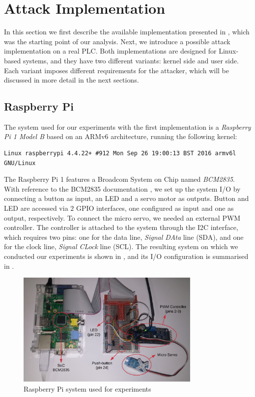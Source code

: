 \section{Attack Implementation}
\label{sec:attack-impl}

In this section we first describe the available implementation presented in \cite{ghostplc}, which was the starting point of our analysis.
Next, we introduce a possible attack implementation on a real PLC. Both implementations are designed for Linux-based systems, and they have two different
variants: kernel side and user side. Each variant imposes different requirements for the attacker, which will be discussed in more detail in the next sections.


\subsection{Raspberry Pi}
\label{sec:attack-pi}

The system used for our experiments with the first implementation is a \emph{Raspberry Pi 1 Model B} based on an ARMv6 architecture, running the following kernel:
\begin{Verbatim}[fontsize=\small]
	Linux raspberrypi 4.4.22+ #912 Mon Sep 26 19:00:13 BST 2016 armv6l GNU/Linux
\end{Verbatim}
The Raspberry Pi 1 features a Broadcom System on Chip named \emph{BCM2835}. With reference to the BCM2835 documentation \cite{bcm2835},
we set up the system I/O by connecting a button as input, an LED and a servo motor as outputs. Button and LED are accessed via $2$ GPIO interfaces,
one configured as input and one as output, respectively. To connect the micro servo, we needed an external PWM controller. The controller is attached to the system
through the I2C interface, which requires two pins: one for the data line, \emph{Signal DAta} line (SDA), and one for the clock line, \emph{Signal CLock} line (SCL).
The resulting system on which we conducted our experiments is shown in , and its I/O configuration is summarised in .

\begin{figure}[h]
\centerline{\includegraphics[width=0.8\textwidth]{res/pi-system}}
\caption{Raspberry Pi system used for experiments \label{fig:pi-system}}
\end{figure}


